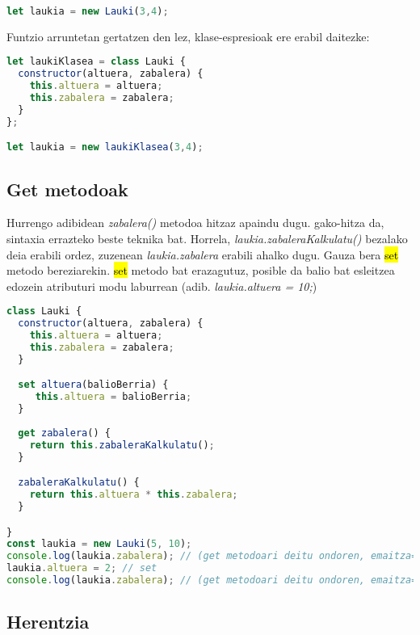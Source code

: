 \begin{lstlisting}[language=JavaScript, numbers=none]
let laukia = new Lauki(3,4);
\end{lstlisting}

Funtzio arruntetan gertatzen den lez, klase-espresioak ere erabil daitezke:
\begin{lstlisting}[language=JavaScript, numbers=none]
let laukiKlasea = class Lauki {
  constructor(altuera, zabalera) {
    this.altuera = altuera;
    this.zabalera = zabalera;
  }
};

let laukia = new laukiKlasea(3,4);
\end{lstlisting}

\subsection{Get metodoak}

Hurrengo adibidean \textit{zabalera()} metodoa  hitzaz apaindu dugu.  gako-hitza da, sintaxia errazteko beste teknika bat. Horrela, \textit{laukia.zabaleraKalkulatu()} bezalako deia erabili ordez, zuzenean \textit{laukia.zabalera} erabili ahalko dugu. Gauza bera \hl{set} metodo bereziarekin. \hl{set} metodo bat erazagutuz, posible da balio bat esleitzea edozein atributuri modu laburrean (adib. \textit{laukia.altuera = 10;})

\begin{lstlisting}[language=JavaScript, numbers=none]
class Lauki {
  constructor(altuera, zabalera) {
    this.altuera = altuera;
    this.zabalera = zabalera;
  }

  set altuera(balioBerria) {
     this.altuera = balioBerria;
  }
  
  get zabalera() {
    return this.zabaleraKalkulatu();
  }

  zabaleraKalkulatu() {
    return this.altuera * this.zabalera;
  }

}
const laukia = new Lauki(5, 10);
console.log(laukia.zabalera); // (get metodoari deitu ondoren, emaitza=50)
laukia.altuera = 2; // set 
console.log(laukia.zabalera); // (get metodoari deitu ondoren, emaitza=20)

\end{lstlisting}

\subsection{Herentzia}

